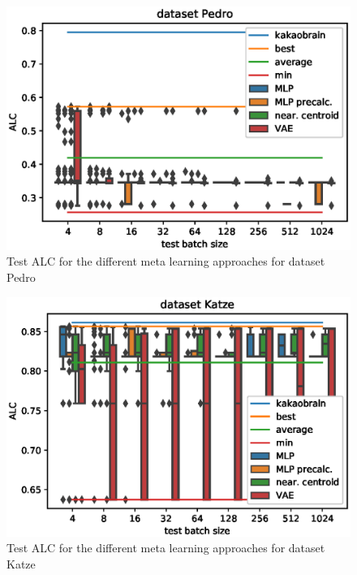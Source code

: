 \documentclass{article}
\begin{document}
\begin{figure}[H]
\begin{center}
 	\includegraphics[width=0.99\linewidth]{../figures/17.eps} 
\end{center}
\caption{Test ALC for the different meta learning approaches for dataset Pedro}
\label{fig:17}
\end{figure} 
\begin{figure}[H]
\begin{center}
 	\includegraphics[width=0.99\linewidth]{../figures/10.eps} 
\end{center}
\caption{Test ALC for the different meta learning approaches for dataset Katze}
\label{fig:10}
\end{figure} 
%
\end{document}
